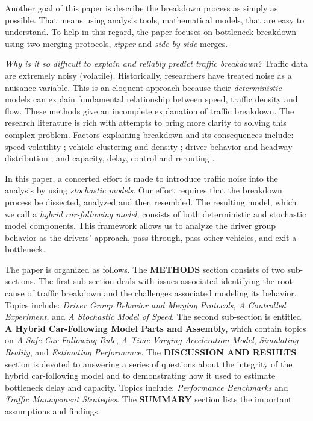 \documentclass[Proceedings]{ascelike}
\begin{document}
Another goal of this paper is describe the breakdown process as simply as possible. That means using analysis tools, mathematical models, that are easy to understand. To help in this regard, the paper focuses on bottleneck breakdown using two merging protocols, \emph{zipper} and \emph{side-by-side} merges.

\emph{Why is it so difficult to explain and reliably predict traffic breakdown?} Traffic data are extremely noisy (volatile). Historically, researchers have treated noise as a nuisance variable. This is an eloquent  approach because their \emph{deterministic} models can explain fundamental relationship between speed, traffic density and flow. These methods give an incomplete explanation of traffic breakdown. The  research literature is rich with attempts to bring more clarity to solving this complex problem.  Factors explaining breakdown and its consequences include: speed volatility  \cite{WAGNER20121384}; vehicle clustering and density \cite{CASTILLO2001367}   \cite{GALTIER2012167} \cite{KISH2000271} \cite{MAHNKE20051} \cite{WEITS1992115}; driver behavior and headway distribution  \cite{OU2018105}; and capacity, delay, control and rerouting \cite{HU2018254} \cite{SMULDERS1990221} \cite{VODOPIVEC201722}. 

In this paper, a concerted effort is made to introduce traffic noise into the analysis by using \emph{stochastic models}. Our effort requires that the breakdown process be dissected, analyzed and then resembled. The resulting model, which we call a \emph{hybrid car-following model,} consists of both deterministic and stochastic model components. This framework allows us to analyze the driver group behavior as the drivers' approach, pass through, pass other vehicles, and exit a bottleneck.

The paper is organized as follows. The \textbf{METHODS} section consists of two sub-sections. The first sub-section deals with issues associated identifying the root cause  of traffic breakdown and the challenges associated modeling its behavior. Topics include:  \emph{Driver Group Behavior and Merging Protocols}, \emph{A Controlled Experiment}, and \emph{A Stochastic Model of Speed}. The second sub-section is entitled \textbf{A Hybrid Car-Following Model Parts and Assembly,} which contain topics on \emph{A Safe Car-Following Rule}, \emph{A Time Varying Acceleration Model}, \emph{Simulating Reality}, and \emph{Estimating Performance}. The \textbf{DISCUSSION AND RESULTS} section is devoted to answering a series of questions about  the integrity of the hybrid car-following model and to demonstrating how  it used to estimate bottleneck delay and capacity. Topics include: \emph{Performance Benchmarks} and \emph{Traffic Management Strategies}. The \textbf{SUMMARY} section lists the  important assumptions and findings.
\end{document}

